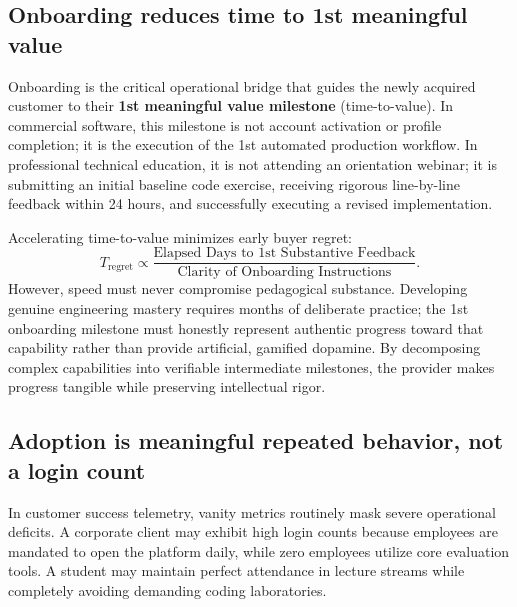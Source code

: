 \subsection{Onboarding reduces time to 1st meaningful value}

Onboarding is the critical operational bridge that guides the newly acquired customer to their \textbf{1st meaningful value milestone} (time-to-value). In commercial software, this milestone is not account activation or profile completion; it is the execution of the 1st automated production workflow. In professional technical education, it is not attending an orientation webinar; it is submitting an initial baseline code exercise, receiving rigorous line-by-line feedback within 24 hours, and successfully executing a revised implementation.

Accelerating time-to-value minimizes early buyer regret:
\begin{equation}
T_{\text{regret}} \propto \frac{\text{Elapsed Days to 1st Substantive Feedback}}{\text{Clarity of Onboarding Instructions}}.
\end{equation}
However, speed must never compromise pedagogical substance. Developing genuine engineering mastery requires months of deliberate practice; the 1st onboarding milestone must honestly represent authentic progress toward that capability rather than provide artificial, gamified dopamine. By decomposing complex capabilities into verifiable intermediate milestones, the provider makes progress tangible while preserving intellectual rigor.

\subsection{Adoption is meaningful repeated behavior, not a login count}

In customer success telemetry, vanity metrics routinely mask severe operational deficits. A corporate client may exhibit high login counts because employees are mandated to open the platform daily, while zero employees utilize core evaluation tools. A student may maintain perfect attendance in lecture streams while completely avoiding demanding coding laboratories.

